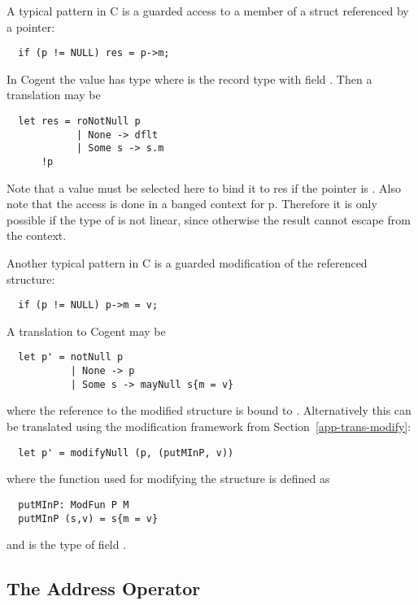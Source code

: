 A typical pattern in C is a guarded access to a member of a struct referenced by a pointer:
\begin{verbatim}
  if (p != NULL) res = p->m;
\end{verbatim}
In Cogent the value  has type  where  is the record type with field . 
Then a translation may be
\begin{verbatim}
  let res = roNotNull p 
            | None -> dflt
            | Some s -> s.m
      !p
\end{verbatim}
Note that a value  must be selected here to bind it to res if the pointer is . Also note that the access is
done in a banged context for p. Therefore it is only possible if the type of  is not linear, since otherwise the result
cannot escape from the context.

Another typical pattern in C is a guarded modification of the referenced structure:
\begin{verbatim}
  if (p != NULL) p->m = v;
\end{verbatim}
A translation to Cogent may be
\begin{verbatim}
  let p' = notNull p 
           | None -> p
           | Some s -> mayNull s{m = v}
\end{verbatim}
where the reference to the modified structure is bound to . Alternatively this can be translated using the modification
framework from Section~\ref{app-trans-modify}:
\begin{verbatim}
  let p' = modifyNull (p, (putMInP, v))
\end{verbatim}
where the function used for modifying the structure is defined as
\begin{verbatim}
  putMInP: ModFun P M
  putMInP (s,v) = s{m = v}
\end{verbatim}
and  is the type of field .

\subsection{The Address Operator \code{\&}}
\label{app-trans-addrop}

